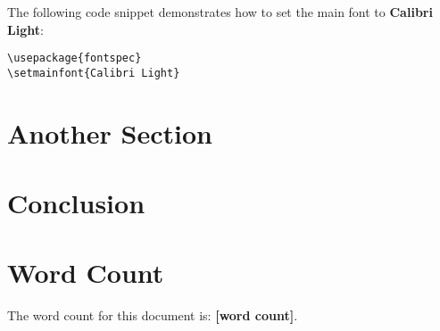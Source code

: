 \documentclass[12pt]{article}
\begin{document}
The following code snippet demonstrates how to set the main font to \textbf{Calibri Light}:
\begin{verbatim}
\usepackage{fontspec}
\setmainfont{Calibri Light}
\end{verbatim}

\section{Another Section}
\label{sec:another-section}

\newpage

\section{Conclusion}
\label{sec:conclusion}

\newpage

\section{Word Count}
\label{sec:word-count}

The word count for this document is: \textbf{[word count]}.



\newpage

\printbibliography
\end{document}
